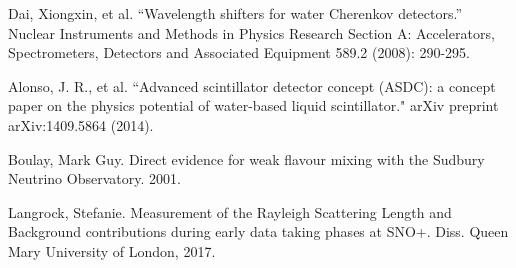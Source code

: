 \documentclass[preprint,12pt]{elsarticle}
\numberwithin{equation}{section}
\begin{document}
\begin{thebibliography}{00}
 Dai, Xiongxin, et al. ``Wavelength shifters for water Cherenkov detectors.'' Nuclear Instruments and Methods in Physics Research Section A: Accelerators, Spectrometers, Detectors and Associated Equipment 589.2 (2008): 290-295.

 Alonso, J. R., et al. ``Advanced scintillator detector concept (ASDC): a concept paper on the physics potential of water-based liquid scintillator." arXiv preprint arXiv:1409.5864 (2014).

 Boulay, Mark Guy. Direct evidence for weak flavour mixing with the Sudbury Neutrino Observatory. 2001.

 Langrock, Stefanie. Measurement of the Rayleigh Scattering Length and Background contributions during early data taking phases at SNO+. Diss. Queen Mary University of London, 2017.

\end{thebibliography}
\end{document}
